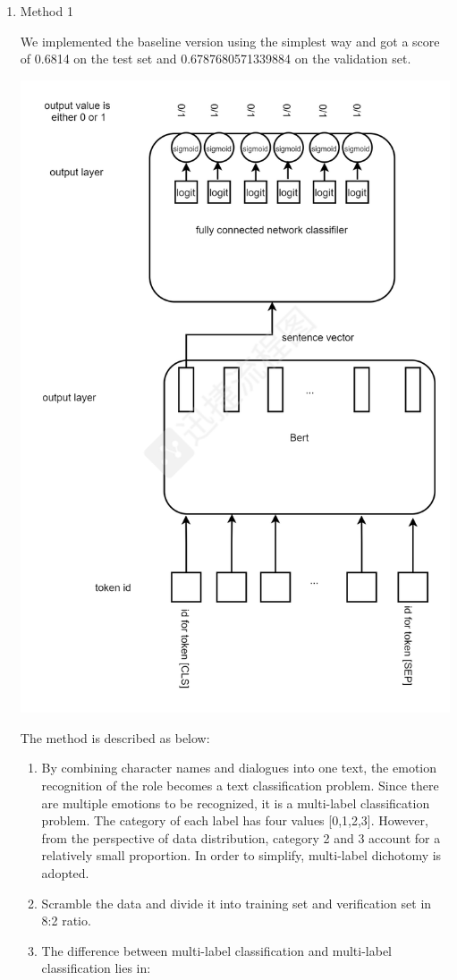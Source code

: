 \documentclass[12pt,twocolumn,letterpaper]{article}
\begin{document}
\begin{enumerate}
\item Method 1

We implemented the baseline version using the simplest way and got a score of 0.6814 on the test set and 0.6787680571339884 on the validation set.

\includegraphics[scale=0.22]{Method1.png}

The method is described as below: 
\begin{enumerate}
\item By combining character names and dialogues into one text, the emotion recognition of the role becomes a text classification problem. Since there are multiple emotions to be recognized, it is a multi-label classification problem. The category of each label has four values [0,1,2,3]. However, from the perspective of data distribution, category 2 and 3 account for a relatively small proportion. In order to simplify, multi-label dichotomy is adopted. 
\item Scramble the data and divide it into training set and verification set in 8:2 ratio.  
\item The difference between multi-label classification and multi-label classification lies in:  


\end{enumerate}
\end{enumerate}
\end{document}
